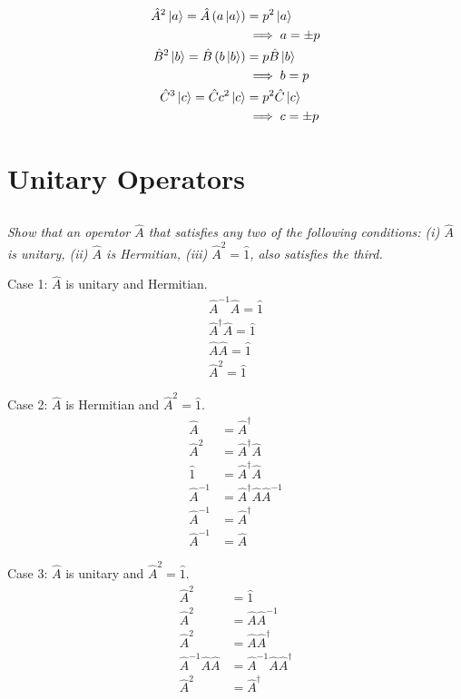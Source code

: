 \documentclass{article}
\begin{document}
\begin{align*}
    \hat{A}^2 \ket a = \hat{A} \left(a \ket a\right)  &= p ^2 \ket a \\
    &\implies a = \pm p \\
    \hat{B}^2 \ket b = \hat{B} \left(b \ket b \right)  &= p \hat{B} \ket b \\
     &\implies b = p \\
    \hat{C}^3 \ket c=\hat{C} c^2 \ket c  &= p^2 \hat{C} \ket c \\
     &\implies c = \pm p \\
\end{align*}

\newpage
\section{Unitary Operators}
\subsection{}
\textit{Show that an operator $\hat{A}$ that satisfies any two of the following conditions: (i) $\hat{A}$ is unitary, (ii) $\hat{A}$ is Hermitian, (iii) $\hat{A}^2 =\hat{1}$, also satisfies the third. }


Case 1: $\hat{A}$ is unitary and Hermitian. 
$$
\begin{array}{r}
\hat{A}^{-1} \hat{A}=\hat{1} \\
\hat{A}^{\dagger} \hat{A}=\hat{1} \\
\hat{A} \hat{A}=\hat{1}  \\
\hat{A}^{2}=\hat{1}  
\end{array}
$$

Case 2: $\hat{A}$ is Hermitian and $\hat{A}^2 = \hat 1$. 
\begin{align*}
    \hat{A}&=\hat{A}^\dagger \\
    \hat{A}^2 &=\hat{A}^\dagger \hat{A} \\ 
    \hat{1}&=\hat{A}^\dagger \hat{A} \\
    \hat{A}^{-1}&=\hat{A}^\dagger \hat{A} \hat{A}^{-1} \\
    \hat{A}^{-1}&=\hat{A}^\dagger\\
    \hat{A}^{-1}&=\hat{A}
\end{align*}

Case 3: $\hat{A}$ is unitary and $\hat{A}^2 = \hat 1$.
\begin{align*}
    \hat{A}^2&=\hat{1} \\
    \hat{A}^2&=\hat{A} \hat{A}^{-1} \\
    \hat{A}^2&=\hat{A} \hat{A}^{\dagger} \\
    \hat{A}^{-1} \hat{A} \hat{A}&=\hat{A}^{-1} \hat{A} \hat{A}^{\dagger} \\
    \hat{A}^2&=\hat{A}^{\dagger} 
\end{align*}
\end{document}
